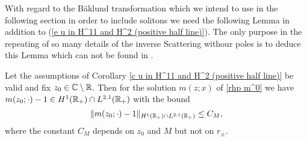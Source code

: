 With regard to the B\"{a}klund transformation which we intend to use in the following section in order to include solitons we need the following Lemma in addition to (\ref{e u in H^11 and H^2 (positive half line)}). The only purpose in the repeating of so many details of the inverse Scattering withour poles is to deduce this Lemma which can not be found in \cite{Pelinovsky2016}.
\begin{lem}\label{l m(z0)-1 in H^11 and H^2}
   Let the assumptions of Corollary \ref{c u in H^11 and H^2 (positive half line)} be valid and fix $z_0\in\mathbb C\setminus\mathbb R$. Then for the solution $m(z;x)$ of \rh \ref{rhp m^0} we have $m(z_0;\cdot)-1\in H^1(\mathbb R_+)\cap L^{2,1}(\mathbb R_+)$ with the bound
   \begin{equation}\label{e m(z0)-1 in H^1 and L^2,1}
       \|m(z_0;\cdot)-1\|_{H^1(\mathbb R_+)\cap L^{2,1}(\mathbb R_+)}\leq C_{M},
   \end{equation}
   where the constant $C_M$ depends on $z_0$ and $M$ but not on $r_{\pm}$.
\end{lem}
